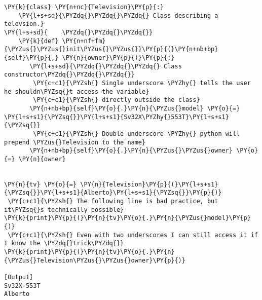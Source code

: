 \begin{Verbatim}[label=\makebox{\url{https://github.com/lucabaldini/cmepda/tree/master/slides/latex/snippets/class\_tv\_private.py}},commandchars=\\\{\}]
\PY{k}{class} \PY{n+nc}{Television}\PY{p}{:}
    \PY{l+s+sd}{\PYZdq{}\PYZdq{}\PYZdq{} Class describing a televsion.}
\PY{l+s+sd}{    \PYZdq{}\PYZdq{}\PYZdq{}}
    \PY{k}{def} \PY{n+nf+fm}{\PYZus{}\PYZus{}init\PYZus{}\PYZus{}}\PY{p}{(}\PY{n+nb+bp}{self}\PY{p}{,} \PY{n}{owner}\PY{p}{)}\PY{p}{:}
       \PY{l+s+sd}{\PYZdq{}\PYZdq{}\PYZdq{} Class constructor\PYZdq{}\PYZdq{}\PYZdq{}}
        \PY{c+c1}{\PYZsh{} Single underscore \PYZhy{} tells the user he shouldn\PYZsq{}t access the variable}
        \PY{c+c1}{\PYZsh{} directly outside the class}
       \PY{n+nb+bp}{self}\PY{o}{.}\PY{n}{\PYZus{}model} \PY{o}{=} \PY{l+s+s1}{\PYZsq{}}\PY{l+s+s1}{Sv32X\PYZhy{}553T}\PY{l+s+s1}{\PYZsq{}}
        \PY{c+c1}{\PYZsh{} Double underscore \PYZhy{} python will prepend \PYZus{}Television to the name}
       \PY{n+nb+bp}{self}\PY{o}{.}\PY{n}{\PYZus{}\PYZus{}owner} \PY{o}{=} \PY{n}{owner}
    

\PY{n}{tv} \PY{o}{=} \PY{n}{Television}\PY{p}{(}\PY{l+s+s1}{\PYZsq{}}\PY{l+s+s1}{Alberto}\PY{l+s+s1}{\PYZsq{}}\PY{p}{)}
 \PY{c+c1}{\PYZsh{} The following line is bad practice, but it\PYZsq{}s technically possible}
\PY{k}{print}\PY{p}{(}\PY{n}{tv}\PY{o}{.}\PY{n}{\PYZus{}model}\PY{p}{)}
 \PY{c+c1}{\PYZsh{} Even with two underscores I can still access it if I know the \PYZdq{}trick\PYZdq{}}
\PY{k}{print}\PY{p}{(}\PY{n}{tv}\PY{o}{.}\PY{n}{\PYZus{}Television\PYZus{}\PYZus{}owner}\PY{p}{)}

[Output]
Sv32X-553T
Alberto
\end{Verbatim}